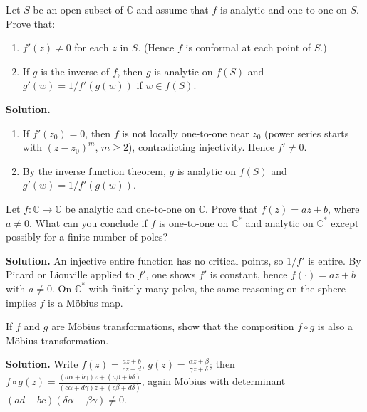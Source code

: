 \begin{problembox}
Let \( S \) be an open subset of \( \mathbb{C} \) and assume that \( f \) is analytic and one-to-one on \( S \). Prove that:
\begin{enumerate}[label=(\alph*)]
\item \( f'(z) \neq 0 \) for each \( z \) in \( S \). (Hence \( f \) is conformal at each point of \( S \).)
\item If \( g \) is the inverse of \( f \), then \( g \) is analytic on \( f(S) \) and \( g'(w) = 1 / f'(g(w)) \) if \( w \in f(S) \).
\end{enumerate}
\end{problembox}

\noindent\textbf{Solution.}
\begin{enumerate}[label=(\alph*)]
\item If $f'(z_0)=0$, then $f$ is not locally one-to-one near $z_0$ (power series starts with $(z-z_0)^m$, $m\ge2$), contradicting injectivity. Hence $f'\ne0$.
\item By the inverse function theorem, $g$ is analytic on $f(S)$ and $g'(w)=1/f'(g(w))$.
\end{enumerate}

\begin{problembox}
Let \( f : \mathbb{C} \to \mathbb{C} \) be analytic and one-to-one on \( \mathbb{C} \). Prove that \( f(z) = a z + b \), where \( a \neq 0 \). What can you conclude if \( f \) is one-to-one on \( \mathbb{C}^* \) and analytic on \( \mathbb{C}^* \) except possibly for a finite number of poles?
\end{problembox}

\noindent\textbf{Solution.}
An injective entire function has no critical points, so $1/f'$ is entire. By Picard or Liouville applied to $f'$, one shows $f'$ is constant, hence $f(\cdot)=a z+b$ with $a\ne0$. On $\mathbb C^*$ with finitely many poles, the same reasoning on the sphere implies $f$ is a Möbius map.

\begin{problembox}
If \( f \) and \( g \) are Möbius transformations, show that the composition \( f \circ g \) is also a Möbius transformation.
\end{problembox}

\noindent\textbf{Solution.}
Write $f(z)=\frac{a z+b}{c z+d}$, $g(z)=\frac{\alpha z+\beta}{\gamma z+\delta}$; then $f\circ g(z)=\frac{(a\alpha+b\gamma)z+(a\beta+b\delta)}{(c\alpha+d\gamma)z+(c\beta+d\delta)}$, again Möbius with determinant $(ad-bc)(\delta\alpha-\beta\gamma)\ne0$.


